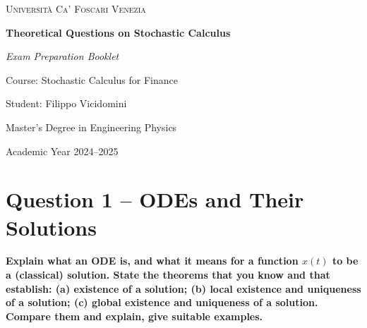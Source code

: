 \documentclass[12pt,a4paper]{book}
\theoremstyle{remark}
\begin{document}
\begin{titlepage}
    \centering
    
    {\scshape Università Ca' Foscari Venezia \par}
 
    \vspace{2cm}
    \vfill
    {\Huge\bfseries Theoretical Questions on Stochastic Calculus \par}
    \vspace{1.5cm}
    {\Large\itshape Exam Preparation Booklet\par}
    
    \vspace{2cm}
    {\Large Course: Stochastic Calculus for Finance \par}
    \vspace{0.5cm}
 
    
    \vfill
    
    {\large Student: Filippo Vicidomini \par}
    {\large Master’s Degree in Engineering Physics\par}
    
    \vfill
    
    {\large Academic Year 2024--2025 \par}
    
\end{titlepage}


\tableofcontents

\clearpage
\label{sec:Contents}
\setcounter{page}{1}

\newpage
\section{Question 1 -- ODEs and Their Solutions}
\textbf{Explain what an ODE is, and what it means for a function $x(t)$ to be a (classical) solution. 
State the theorems that you know and that establish: (a) existence of a solution; (b) local existence and uniqueness of a solution; (c) global existence and uniqueness of a solution. 
Compare them and explain, give suitable examples.}
\end{document}
